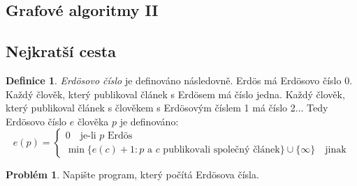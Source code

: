 \documentclass[a4paper,10pt,oneside]{article}
\theoremstyle{definition}
\newtheorem{definition}[subsection]{Definice}
\newtheorem{question}[subsection]{Problém}
\begin{document}
\title{}



\thispagestyle{empty}
\pagestyle{empty}
\parindent=0cm
\parskip=0.2cm

\begin{center}
\section*{Grafové algoritmy II}
\end{center}
\addtocounter{section}{1}

\subsection{Nejkratší cesta}


\begin{definition} \emph{Erdösovo číslo} je definováno následovně. Erdös má Erdösovo číslo 0. Každý člověk, který publikoval článek s Erdösem
má číslo jedna. Každý člověk, který publikoval článek s člověkem s Erdösovým číslem 1 má číslo 2... Tedy Erdösovo číslo $e$ člověka $p$
je definováno:
\begin{displaymath}
 e(p) = 
 \begin{cases}
 0\quad\mbox{je-li $p$ Erdös}\\
 \min\{ e(c)+1:\mbox{$p$ a $c$ publikovali společný článek}\}\cup\{\infty\}\quad\mbox{jinak}
 \end{cases}
\end{displaymath}
\end{definition}


\begin{question} Napište program, který počítá Erdösova čísla.
\end{question}
\end{document}
